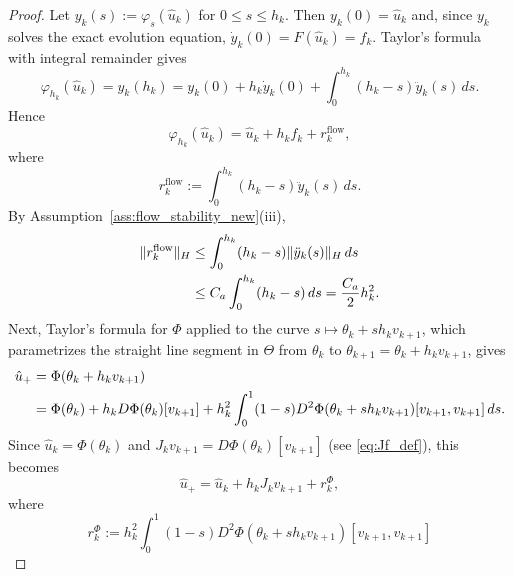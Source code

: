 \documentclass[10pt,a4paper]{amsart}
\newcommand{\norm}[1]{\lVert #1\rVert}
\begin{document}
\begin{proof}
  Let $ y_k(s):=\varphi_s(\hat u_k)$ for $0\le s\le h_k$.
  Then $y_k(0)=\hat u_k$ and, since $y_k$ solves the exact evolution equation, $\dot y_k(0)=F(\hat u_k)=f_k$.
  Taylor's formula with integral remainder gives
  \begin{equation}
    \varphi_{h_k}(\hat u_k)
    =
    y_k(h_k)
    =
    y_k(0)+h_k\dot y_k(0)
    +
    \int_0^{h_k}(h_k-s)\ddot y_k(s)\,ds .
    \label{eq:flow_taylor_integral_new}
  \end{equation}
  Hence
  \begin{equation}
    \varphi_{h_k}(\hat u_k)
    =
    \hat u_k+h_k f_k+r_k^{\mathrm{flow}},
    \label{eq:flow_taylor_new}
  \end{equation}
  where
  \begin{equation}
    r_k^{\mathrm{flow}}
    :=
    \int_0^{h_k}(h_k-s)\ddot y_k(s)\,ds .
    \label{eq:flow_remainder_def_new}
  \end{equation}
  By Assumption~\ref{ass:flow_stability_new}\textnormal{(iii)},
  \begin{align}
    \norm{r_k^{\mathrm{flow}}}_H
     & \le
    \int_0^{h_k}(h_k-s)\norm{\ddot y_k(s)}_H\,ds
    \notag \\
     & \le
    C_a\int_0^{h_k}(h_k-s)\,ds
    =
    \frac{C_a}{2}h_k^2 .
    \label{eq:flow_remainder_bound_new}
  \end{align}
  Next, Taylor's formula for $\Phi$ applied to the curve $s \mapsto \theta_k + sh_k v_{k + 1}$, which parametrizes the straight line segment in $\Theta$ from $\theta_k$ to $\theta_{k + 1} = \theta_k + h_k v_{k + 1}$,  gives
  \begin{align}
    \hat u_+
     & =
    \Phi(\theta_k+h_kv_{k+1})
    \notag \\
     & =
    \Phi(\theta_k)
    +
    h_kD\Phi(\theta_k)[v_{k+1}]
    +
    h_k^2
    \int_0^1
    (1-s)
    D^2\Phi(\theta_k+s h_kv_{k+1})
    [v_{k+1},v_{k+1}]
    \,ds .
    \label{eq:Phi_taylor_integral_new}
  \end{align}
  Since $\hat u_k=\Phi(\theta_k)$ and
  $J_kv_{k+1}=D\Phi(\theta_k)[v_{k+1}]$ (see \eqref{eq:Jf_def}), this becomes
  \begin{equation}
    \hat u_+
    =
    \hat u_k+h_kJ_kv_{k+1}+r_k^\Phi,
    \label{eq:Phi_taylor_new}
  \end{equation}
  where
  \begin{equation}
    r_k^\Phi
    :=
    h_k^2
    \int_0^1
    (1-s)
    D^2\Phi(\theta_k+s h_kv_{k+1})
    [v_{k+1},v_{k+1}]

\end{equation}
\end{proof}
\end{document}
